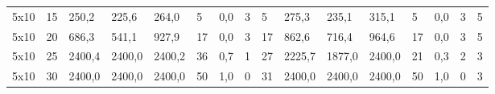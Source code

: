 \begin{table}[]
\begin{tabular}{llllllllllllllll}
		5x10    & 15     & 250,2                                               & 225,6                                               & 264,0                                               & 5                                                   & 0,0                                                 & 3      & 5                                                         & 275,3                                               & 235,1                                               & 315,1                                               & 5                                                   & 0,0                                                 & 3      & 5                                                         \\
		5x10    & 20     & 686,3                                               & 541,1                                               & 927,9                                               & 17                                                  & 0,0                                                 & 3      & 17                                                        & 862,6                                               & 716,4                                               & 964,6                                               & 17                                                  & 0,0                                                 & 3      & 5                                                         \\
		5x10    & 25     & 2400,4                                              & 2400,0                                              & 2400,2                                              & 36                                                  & 0,7                                                 & 1      & 27                                                        & 2225,7                                              & 1877,0                                              & 2400,0                                              & 21                                                  & 0,3                                                 & 2      & 3                                                         \\
		5x10    & 30     & 2400,0                                              & 2400,0                                              & 2400,0                                              & 50                                                  & 1,0                                                 & 0      & 31                                                        & 2400,0                                              & 2400,0                                              & 2400,0                                              & 50                                                  & 1,0                                                 & 0      & 3                                                         \\

\end{tabular}
\end{table}

